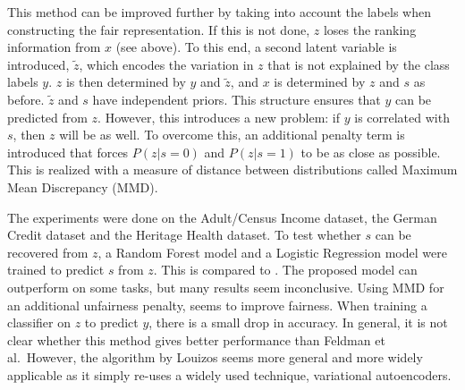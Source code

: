 This method can be improved further by taking into account the labels
when constructing the fair representation.
If this is not done, \(z\) loses the ranking information from \(x\) (see \citet{feldman2015certifying} above).
To this end, a second latent variable is introduced, \(\tilde{z}\),
which encodes the variation in \(z\) that is not explained by the class labels \(y\).
\(z\) is then determined by \(y\) and \(\tilde{z}\),
and \(x\) is determined by \(z\) and \(s\) as before.
\(\tilde{z}\) and \(s\) have independent priors.
This structure ensures that \(y\) can be predicted from \(z\).
However, this introduces a new problem:
if \(y\) is correlated with \(s\), then \(z\) will be as well.
To overcome this, an additional penalty term is introduced that forces \(P(z|s=0)\)
and \(P(z|s=1)\) to be as close as possible.
This is realized with a measure of distance
between distributions called Maximum Mean Discrepancy (MMD).

The experiments were done on the Adult/Census Income dataset,
the German Credit dataset and the Heritage Health dataset.
To test whether \(s\) can be recovered from \(z\),
a Random Forest model and a Logistic Regression model were trained to predict \(s\) from \(z\).
This is compared to \citet{zemel2013learning}.
The proposed model can outperform \citet{zemel2013learning} on some tasks, but many results seem inconclusive.
Using MMD for an additional unfairness penalty, seems to improve fairness.
When training a classifier on \(z\) to predict \(y\), there is a small drop in accuracy.
In general, it is not clear whether this method gives better performance than Feldman et
al.~However, the algorithm by Louizos seems more general and more widely applicable
as it simply re-uses a widely used technique, variational autoencoders.

